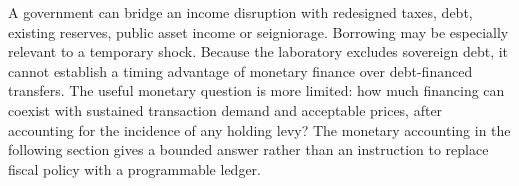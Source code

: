 A government can bridge an income disruption with redesigned taxes, debt, existing reserves, public asset income or seigniorage. Borrowing may be especially relevant to a temporary shock. Because the laboratory excludes sovereign debt, it cannot establish a timing advantage of monetary finance over debt-financed transfers. The useful monetary question is more limited: how much financing can coexist with sustained transaction demand and acceptable prices, after accounting for the incidence of any holding levy? The monetary accounting in the following section gives a bounded answer rather than an instruction to replace fiscal policy with a programmable ledger.
